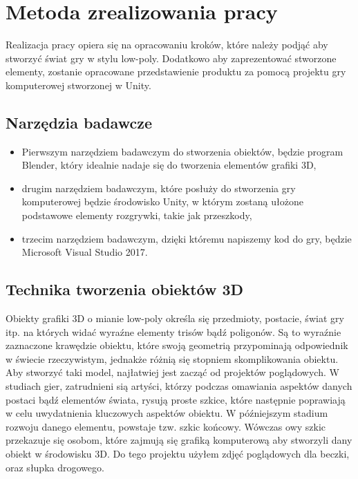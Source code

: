 \chapter{Metoda zrealizowania pracy}
Realizacja pracy opiera się na opracowaniu kroków, które należy podjąć aby stworzyć świat gry w stylu low-poly. Dodatkowo aby zaprezentować stworzone elementy, zostanie opracowane przedstawienie produktu za pomocą projektu gry komputerowej stworzonej w Unity.
\section{Narzędzia badawcze}
\begin{itemize}
\item Pierwszym narzędziem badawczym do stworzenia obiektów, będzie program Blender, który idealnie nadaje się do tworzenia elementów grafiki 3D,

\item drugim narzędziem badawczym, które posłuży do stworzenia gry komputerowej będzie środowisko Unity, w którym zostaną ułożone podstawowe elementy rozgrywki, takie jak przeszkody,

\item trzecim narzędziem badawczym, dzięki któremu napiszemy kod do gry, będzie Microsoft Visual Studio 2017.

\end{itemize}

\section{Technika tworzenia obiektów 3D}
\indent Obiekty grafiki 3D o mianie low-poly określa się przedmioty, postacie, świat gry itp. na których widać wyraźne elementy trisów bądź poligonów. Są to wyraźnie zaznaczone krawędzie obiektu, które swoją geometrią przypominają odpowiednik w świecie rzeczywistym, jednakże różnią się stopniem skomplikowania obiektu. Aby stworzyć taki model, najłatwiej jest zacząć od projektów poglądowych. W studiach gier, zatrudnieni sią artyści, którzy podczas omawiania aspektów danych postaci bądź elementów świata, rysują proste szkice, które następnie poprawiają w celu uwydatnienia kluczowych aspektów obiektu. 
W późniejszym stadium rozwoju danego elementu, powstaje tzw. szkic końcowy. Wówczas owy szkic przekazuje się osobom, które zajmują się grafiką komputerową aby stworzyli dany obiekt w środowisku 3D. Do tego projektu użyłem zdjęć poglądowych dla beczki, oraz słupka drogowego.

